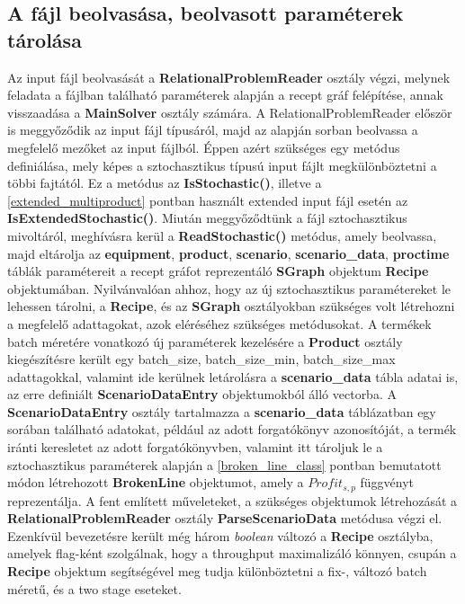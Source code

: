 \subsection{A fájl beolvasása, beolvasott paraméterek tárolása}
Az input fájl beolvasását a \textbf{RelationalProblemReader} osztály végzi, melynek feladata a fájlban található paraméterek alapján a recept gráf felépítése, annak visszaadása a \textbf{MainSolver }osztály számára. A RelationalProblemReader először is meggyőződik az input fájl típusáról, majd az alapján sorban beolvassa a megfelelő mezőket az input fájlból. Éppen azért szükséges egy metódus definiálása, mely képes a sztochasztikus típusú input fájlt megkülönböztetni a többi fajtától. Ez a metódus az \textbf{IsStochastic()}, illetve a \ref{extended_multiproduct} pontban használt extended input fájl esetén az \textbf{IsExtendedStochastic()}. Miután meggyőződtünk a fájl sztochasztikus mivoltáról, meghívásra kerül a \textbf{ReadStochastic()} metódus, amely beolvassa, majd eltárolja az \textbf{equipment}, \textbf{product}, \textbf{scenario}, \textbf{scenario\_data}, \textbf{proctime} táblák paramétereit a recept gráfot reprezentáló \textbf{SGraph} objektum \textbf{Recipe} objektumában. Nyilvánvalóan ahhoz, hogy az új sztochasztikus paramétereket le lehessen tárolni, a \textbf{Recipe}, és az \textbf{SGraph} osztályokban szükséges volt létrehozni a megfelelő adattagokat, azok eléréséhez szükséges metódusokat. A termékek batch méretére vonatkozó új paraméterek kezelésére a \textbf{Product} osztály kiegészítésre került egy batch\_size, batch\_size\_min, batch\_size\_max adattagokkal, valamint ide kerülnek letárolásra a \textbf{scenario\_data} tábla adatai is, az erre definiált \textbf{ScenarioDataEntry} objektumokból álló vectorba. A \textbf{ScenarioDataEntry} osztály tartalmazza a \textbf{scenario\_data} táblázatban egy sorában található adatokat, például az adott forgatókönyv azonosítóját, a termék iránti keresletet az adott forgatókönyvben, valamint itt tároljuk le a sztochasztikus paraméterek alapján a \ref{broken_line_class} pontban bemutatott módon létrehozott \textbf{BrokenLine} objektumot, amely a $Profit_{s,p}$ függvényt reprezentálja. A fent említett műveleteket, a szükséges objektumok létrehozását a \textbf{RelationalProblemReader} osztály \textbf{ParseScenarioData} metódusa végzi el. Ezenkívül bevezetésre került még három \textit{boolean} változó a \textbf{Recipe} osztályba,  amelyek flag-ként szolgálnak, hogy a throughput maximalizáló könnyen, csupán a \textbf{Recipe} objektum segítségével meg tudja különböztetni a fix-, változó batch méretű, és a two stage eseteket.
